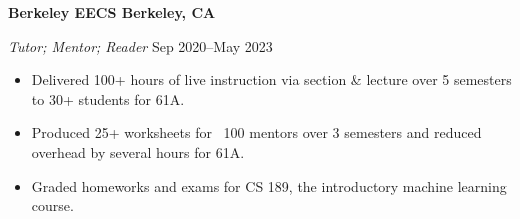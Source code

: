\textbf{Berkeley EECS \hfill Berkeley, CA} \par
\textit{Tutor; Mentor; Reader} \hfill Sep 2020--May 2023 \par
\begin{itemize}
	\item Delivered 100+ hours of live instruction via section \& lecture over 5 semesters to 30+ students for 61A.
	\item Produced 25+ worksheets for ~100 mentors over 3 semesters and reduced overhead by several hours for 61A.
	\item Graded homeworks and exams for CS 189, the introductory machine learning course.
\end{itemize}\par